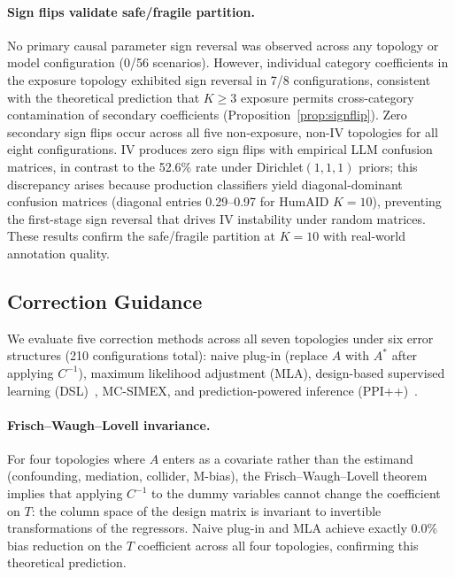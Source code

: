 \paragraph{Sign flips validate safe/fragile partition.}
No primary causal parameter sign reversal was observed across any topology or model configuration (0/56 scenarios). However, individual category coefficients in the exposure topology exhibited sign reversal in 7/8 configurations, consistent with the theoretical prediction that $K{\geq}3$ exposure permits cross-category contamination of secondary coefficients (Proposition~\ref{prop:signflip}). Zero secondary sign flips occur across all five non-exposure, non-IV topologies for all eight configurations. IV produces zero sign flips with empirical LLM confusion matrices, in contrast to the 52.6\% rate under Dirichlet$(1,1,1)$ priors; this discrepancy arises because production classifiers yield diagonal-dominant confusion matrices (diagonal entries 0.29--0.97 for HumAID $K{=}10$), preventing the first-stage sign reversal that drives IV instability under random matrices. These results confirm the safe/fragile partition at $K{=}10$ with real-world annotation quality.

\subsection{Correction Guidance}
\label{sec:correction}

We evaluate five correction methods across all seven topologies under six error structures (210 configurations total): naive plug-in (replace $A$ with $A^*$ after applying $C^{-1}$), maximum likelihood adjustment (MLA), design-based supervised learning (DSL)~\cite{egami_hinck_stewart_wei2023}, MC-SIMEX, and prediction-powered inference (PPI++)~\cite{angelopoulos2023}.

\paragraph{Frisch--Waugh--Lovell invariance.}
For four topologies where $A$ enters as a covariate rather than the estimand (confounding, mediation, collider, M-bias), the Frisch--Waugh--Lovell theorem implies that applying $C^{-1}$ to the dummy variables cannot change the coefficient on $T$: the column space of the design matrix is invariant to invertible transformations of the regressors. Naive plug-in and MLA achieve exactly 0.0\% bias reduction on the $T$ coefficient across all four topologies, confirming this theoretical prediction.

